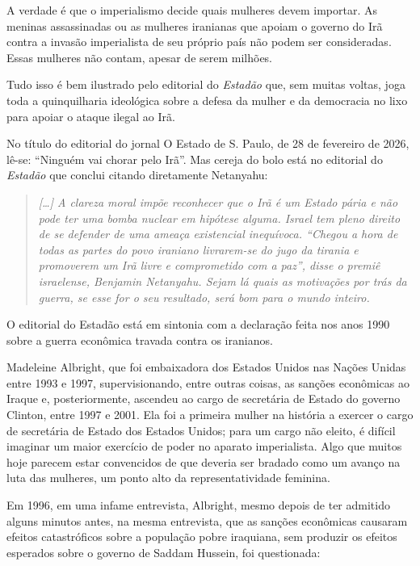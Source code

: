 \documentclass[12pt,twocolumn]{article}
\begin{document}
A verdade é que o imperialismo decide quais mulheres devem importar. As meninas assassinadas ou as mulheres iranianas que apoiam o governo do Irã contra a invasão imperialista de seu próprio país não podem ser consideradas. Essas mulheres não contam, apesar de serem milhões.

Tudo isso é bem ilustrado pelo editorial do \emph{Estadão} que, sem muitas voltas, joga toda a quinquilharia ideológica sobre a defesa da mulher e da democracia no lixo para apoiar o ataque ilegal ao Irã.

No título do editorial do jornal O Estado de S. Paulo, de 28 de fevereiro de 2026, lê-se: ``Ninguém vai chorar pelo Irã''. Mas cereja do bolo está no editorial do \emph{Estadão} que conclui citando diretamente Netanyahu:
\begin{quote}


\emph{{[}\ldots{}] A clareza moral impõe reconhecer que o Irã é um Estado pária e não pode ter uma bomba nuclear em hipótese alguma. Israel tem pleno direito de se defender de uma ameaça existencial inequívoca. “Chegou a hora de todas as partes do povo iraniano livrarem-se do jugo da tirania e promoverem um Irã livre e comprometido com a paz”, disse o premiê israelense, Benjamin Netanyahu. Sejam lá quais as motivações por trás da guerra, se esse for o seu resultado, será bom para o mundo inteiro.}
\end{quote}
O editorial do Estadão está em sintonia com a declaração feita nos anos 1990 sobre a guerra econômica travada contra os iranianos.

Madeleine Albright, que foi embaixadora dos Estados Unidos nas Nações Unidas entre 1993 e 1997, supervisionando, entre outras coisas, as sanções econômicas ao Iraque e, posteriormente, ascendeu ao cargo de secretária de Estado do governo Clinton, entre 1997 e 2001. Ela foi a primeira mulher na história a exercer o cargo de secretária de Estado dos Estados Unidos; para um cargo não eleito, é difícil imaginar um maior exercício de poder no aparato imperialista. Algo que muitos hoje parecem estar convencidos de que deveria ser bradado como um avanço na luta das mulheres, um ponto alto da representatividade feminina.

Em 1996, em uma infame entrevista, Albright, mesmo depois de ter admitido alguns minutos antes, na mesma entrevista, que as sanções econômicas causaram efeitos catastróficos sobre a população pobre iraquiana, sem produzir os efeitos esperados sobre o governo de Saddam Hussein, foi questionada:
\end{document}
